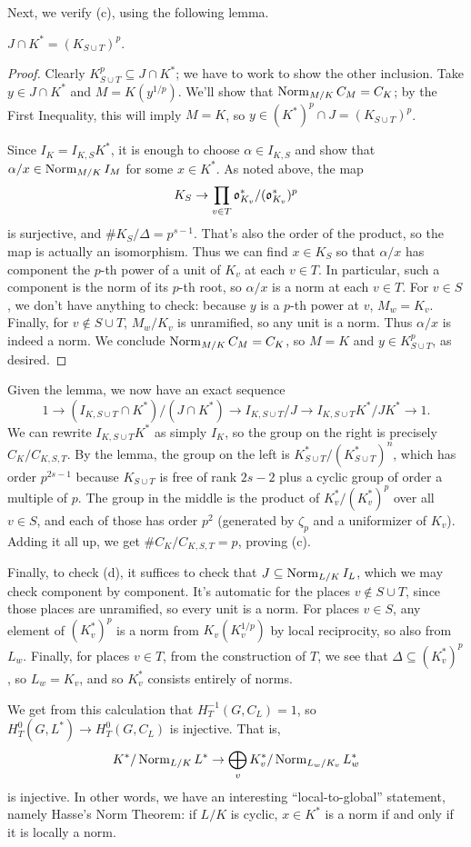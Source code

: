 Next, we verify (c), using the following lemma.
\begin{lemma} \label{L:adelic intersection}
$J \cap K^* = (K_{S \cup T})^p$.
\end{lemma}
\begin{proof}
Clearly $K_{S \cup T}^p \subseteq J \cap K^*$; we have to work
to show the other inclusion. Take $y \in J \cap K^*$ and
$M = K(y^{1/p})$. We'll show that $\operatorname{Norm}_{M/K} C_M = C_K$; by the First
Inequality, this will imply $M = K$, so $y \in (K^*)^p \cap J
= (K_{S \cup T})^p$.

Since $I_K = I_{K,S}K^*$, it is enough to choose $\alpha \in I_{K,S}$
and show that $\alpha/x \in \operatorname{Norm}_{M/K} I_M$ for some $x \in K^*$.
As noted above, the map
\[
K_S \to \prod_{v \in T} \mathfrak{o}_{K_v}^*/(\mathfrak{o}_{K_v}^*)^p
\]
is surjective, and $\#K_S/\Delta = p^{s-1}$. That's also the order of
the product, so the map is actually an isomorphism. Thus we can find
$x \in K_S$ so that $\alpha/x$ has component the $p$-th power of a unit
of $K_v$
at each $v \in T$. In particular, such a component is the norm of its
$p$-th root, so $\alpha/x$ is a norm at each $v \in T$. For $v \in S$,
we don't have anything to check: because $y$ is a $p$-th power at $v$,
$M_w = K_v$. Finally, for $v \notin S \cup T$, $M_w/K_v$ is unramified,
so any unit is a norm. Thus $\alpha/x$ is indeed a norm. We conclude
$\operatorname{Norm}_{M/K} C_M = C_K$, so $M=K$ and $y \in K_{S\cup T}^p$,
as desired.
\end{proof}

Given the lemma, we now have an exact sequence
\[
1 \to (I_{K,S\cup T} \cap K^*)/(J \cap K^*) 
\to I_{K,S\cup T}/J \to
I_{K,S \cup T}K^* / JK^* \to 1.
\]
We can rewrite $I_{K,S \cup T}K^*$ as simply $I_K$, so the group on the
right is precisely $C_K/C_{K,S,T}$. By the lemma, the group on the left is
$K_{S\cup T}^*/(K_{S \cup T}^*)^n$, which has order $p^{2s-1}$ because
$K_{S\cup T}$ is free of rank $2s-2$ plus a cyclic group of order a multiple
of $p$. The group in the middle is the product of $K_v^*/(K_v^*)^p$
over all $v \in S$, and each of those has order $p^2$ (generated by
$\zeta_p$ and a uniformizer of $K_v$). Adding it all up,
we get $\#C_K/C_{K,S,T} = p$, proving (c).

Finally, to check (d), it suffices to check that $J
\subseteq \operatorname{Norm}_{L/K} I_L$, which we may check component by component.
It's automatic for the places $v \notin S \cup T$, since those places
are unramified, so every unit is a norm. For places $v \in S$, any element
of $(K_v^*)^p$ is a norm from $K_v(K_v^{1/p})$ by local reciprocity, so also from $L_w$.
Finally, for places $v \in T$, from the construction of $T$, we see
that $\Delta \subseteq (K_v^*)^p$, so $L_w = K_v$, and so
$K_v^*$ consists entirely of norms.

 We get from this calculation that $H^{-1}_T(G, C_L) = 1$, so
$H^0_T(G, L^*) \to H^0_T(G, C_L)$ is injective. That is,
\[
K^*/\operatorname{Norm}_{L/K} L^* \to \bigoplus_v K_v^*/\operatorname{Norm}_{L_w/K_v} L_w^*
\]
is injective. In other words, we have an interesting ``local-to-global''
statement, namely Hasse's Norm Theorem: if $L/K$
is cyclic, $x \in K^*$ is a norm if and only if it is locally a norm.

%

